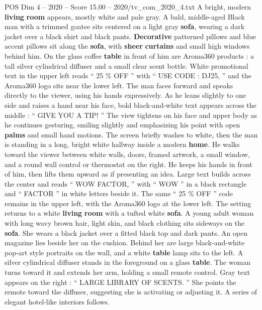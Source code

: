 \begin{textsample}{POS Dim 4 – 2020 – Score 15.00 – 2020/tv\_com\_2020\_4.txt}  \label{ex:f4_pos_019}
A bright, modern \textbf{living} \textbf{room} appears, mostly white and pale gray.
A bald, middle-aged Black man with a trimmed goatee sits centered on a light gray \textbf{sofa}, wearing a dark jacket over a black shirt and black pants. \textbf{Decorative} patterned pillows and blue accent pillows sit along the \textbf{sofa}, with \textbf{sheer} \textbf{curtains} and small high windows behind him.
On the glass coffee \textbf{table} in front of him are Aroma360 products : a tall silver cylindrical diffuser and a small clear scent bottle.
White promotional text in the upper left reads “ 25 \% OFF ” with “ USE CODE : DJ25, ” and the Aroma360 logo sits near the lower left.
The man faces forward and speaks directly to the viewer, using his hands expressively.
As he leans slightly to one side and raises a hand near his face, bold black-and-white text appears across the middle : “ GIVE YOU A TIP! ” The view tightens on his face and upper body as he continues gesturing, smiling slightly and emphasizing his point with open \textbf{palms} and small hand motions.
The screen briefly washes to white, then the man is standing in a long, bright white hallway inside a modern \textbf{home}.
He walks toward the viewer between white walls, doors, framed artwork, a small window, and a round wall control or thermostat on the right.
He keeps his hands in front of him, then lifts them upward as if presenting an idea.
Large text builds across the center and reads “ WOW FACTOR, ” with “ WOW ” in a black rectangle and “ FACTOR ” in white letters beside it.
The same “ 25 \% OFF ” code remains in the upper left, with the Aroma360 logo at the lower left.
The setting returns to a white \textbf{living} \textbf{room} with a tufted white \textbf{sofa}.
A young adult woman with long wavy brown hair, light skin, and black clothing sits sideways on the \textbf{sofa}.
She wears a black jacket over a fitted black top and dark pants.
An open magazine lies beside her on the cushion.
Behind her are large black-and-white pop-art style portraits on the wall, and a white \textbf{table} lamp sits to the left.
A silver cylindrical diffuser stands in the foreground on a glass \textbf{table}.
The woman turns toward it and extends her arm, holding a small remote control.
Gray text appears on the right : “ LARGE LIBRARY OF SCENTS. ” She points the remote toward the diffuser, suggesting she is activating or adjusting it.
A series of elegant hotel-like interiors follows.

\end{textsample}
